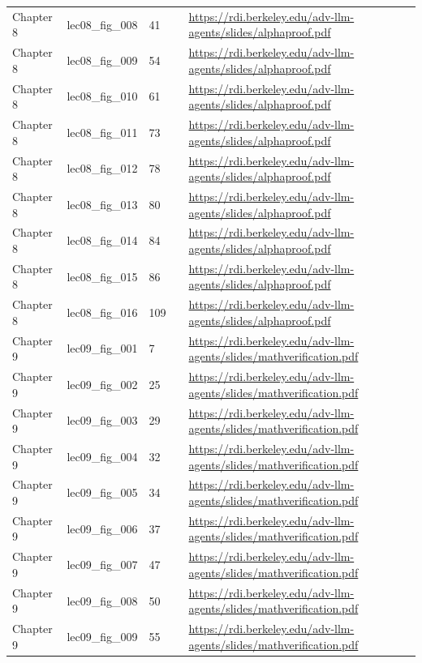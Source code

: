 \begin{longtable}{p{}p{}p{}p{}p{}}
Chapter 8 & lec08\_fig\_008 & 41 &  & \url{https://rdi.berkeley.edu/adv-llm-agents/slides/alphaproof.pdf} \\
Chapter 8 & lec08\_fig\_009 & 54 &  & \url{https://rdi.berkeley.edu/adv-llm-agents/slides/alphaproof.pdf} \\
Chapter 8 & lec08\_fig\_010 & 61 &  & \url{https://rdi.berkeley.edu/adv-llm-agents/slides/alphaproof.pdf} \\
Chapter 8 & lec08\_fig\_011 & 73 &  & \url{https://rdi.berkeley.edu/adv-llm-agents/slides/alphaproof.pdf} \\
Chapter 8 & lec08\_fig\_012 & 78 &  & \url{https://rdi.berkeley.edu/adv-llm-agents/slides/alphaproof.pdf} \\
Chapter 8 & lec08\_fig\_013 & 80 &  & \url{https://rdi.berkeley.edu/adv-llm-agents/slides/alphaproof.pdf} \\
Chapter 8 & lec08\_fig\_014 & 84 &  & \url{https://rdi.berkeley.edu/adv-llm-agents/slides/alphaproof.pdf} \\
Chapter 8 & lec08\_fig\_015 & 86 &  & \url{https://rdi.berkeley.edu/adv-llm-agents/slides/alphaproof.pdf} \\
Chapter 8 & lec08\_fig\_016 & 109 &  & \url{https://rdi.berkeley.edu/adv-llm-agents/slides/alphaproof.pdf} \\
Chapter 9 & lec09\_fig\_001 & 7 &  & \url{https://rdi.berkeley.edu/adv-llm-agents/slides/mathverification.pdf} \\
Chapter 9 & lec09\_fig\_002 & 25 &  & \url{https://rdi.berkeley.edu/adv-llm-agents/slides/mathverification.pdf} \\
Chapter 9 & lec09\_fig\_003 & 29 &  & \url{https://rdi.berkeley.edu/adv-llm-agents/slides/mathverification.pdf} \\
Chapter 9 & lec09\_fig\_004 & 32 &  & \url{https://rdi.berkeley.edu/adv-llm-agents/slides/mathverification.pdf} \\
Chapter 9 & lec09\_fig\_005 & 34 &  & \url{https://rdi.berkeley.edu/adv-llm-agents/slides/mathverification.pdf} \\
Chapter 9 & lec09\_fig\_006 & 37 &  & \url{https://rdi.berkeley.edu/adv-llm-agents/slides/mathverification.pdf} \\
Chapter 9 & lec09\_fig\_007 & 47 &  & \url{https://rdi.berkeley.edu/adv-llm-agents/slides/mathverification.pdf} \\
Chapter 9 & lec09\_fig\_008 & 50 &  & \url{https://rdi.berkeley.edu/adv-llm-agents/slides/mathverification.pdf} \\
Chapter 9 & lec09\_fig\_009 & 55 &  & \url{https://rdi.berkeley.edu/adv-llm-agents/slides/mathverification.pdf} \\

\end{longtable}
